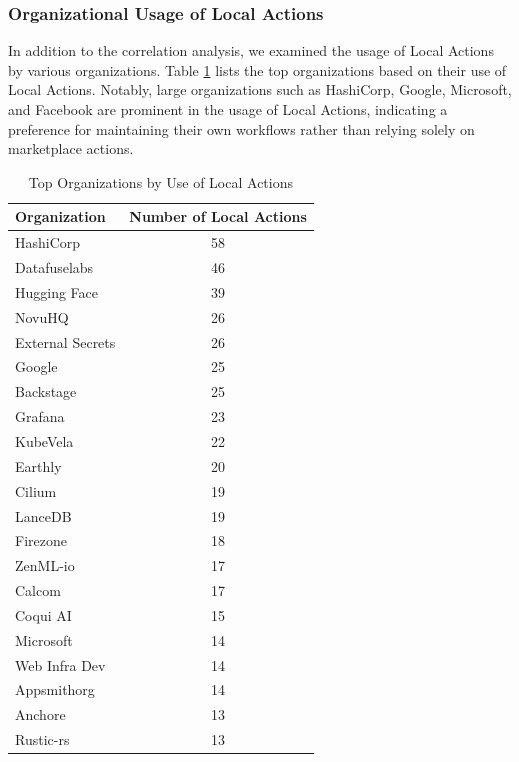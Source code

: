 \documentclass[conference]{IEEEtran}
\begin{document}
      \subsubsection{Organizational Usage of Local Actions}

      In addition to the correlation analysis, we examined the usage of Local Actions by various organizations. Table \ref{tab:org_usage} lists the top organizations based on their use of Local Actions. Notably, large organizations such as HashiCorp, Google, Microsoft, and Facebook are prominent in the usage of Local Actions, indicating a preference for maintaining their own workflows rather than relying solely on marketplace actions.
      
      \begin{table}[h]
          \centering
          \caption{Top Organizations by Use of Local Actions}
          \label{tab:org_usage}
          \begin{tabular}{|l|c|}
              \hline
              \textbf{Organization} & \textbf{Number of Local Actions} \\
              \hline
              HashiCorp & 58 \\
              Datafuselabs & 46 \\
              Hugging Face & 39 \\
              NovuHQ & 26 \\
              External Secrets & 26 \\
              Google & 25 \\
              Backstage & 25 \\
              Grafana & 23 \\
              KubeVela & 22 \\
              Earthly & 20 \\
              Cilium & 19 \\
              LanceDB & 19 \\
              Firezone & 18 \\
              ZenML-io & 17 \\
              Calcom & 17 \\
              Coqui AI & 15 \\
              Microsoft & 14 \\
              Web Infra Dev & 14 \\
              Appsmithorg & 14 \\
              Anchore & 13 \\
              Rustic-rs & 13 \\

\end{tabular}
\end{table}
\end{document}
